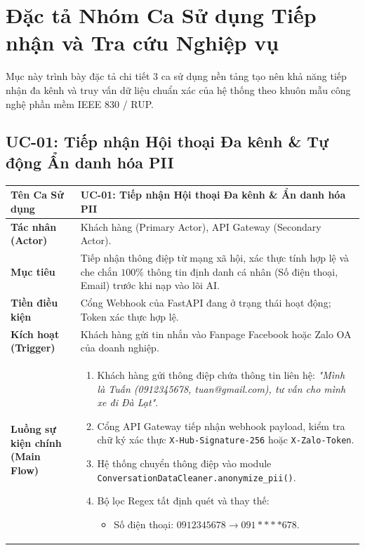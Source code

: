 \section{Đặc tả Nhóm Ca Sử dụng Tiếp nhận và Tra cứu Nghiệp vụ}
\label{sec:dacta_tuvan_nghiepvu}

Mục này trình bày đặc tả chi tiết 3 ca sử dụng nền tảng tạo nên khả năng tiếp nhận đa kênh và truy vấn dữ liệu chuẩn xác của hệ thống theo khuôn mẫu công nghệ phần mềm IEEE 830 / RUP.

\subsection{UC-01: Tiếp nhận Hội thoại Đa kênh \& Tự động Ẩn danh hóa PII}
\label{subsec:spec_uc01}

\begin{table}[h!]
\centering
\small
\begin{tabular}{|p{3.2cm}|p{11.5cm}|}
\hline
\textbf{Tên Ca Sử dụng} & \textbf{UC-01: Tiếp nhận Hội thoại Đa kênh \& Ẩn danh hóa PII} \\
\hline
\textbf{Tác nhân (Actor)} & Khách hàng (Primary Actor), API Gateway (Secondary Actor). \\
\hline
\textbf{Mục tiêu} & Tiếp nhận thông điệp từ mạng xã hội, xác thực tính hợp lệ và che chắn $100\%$ thông tin định danh cá nhân (Số điện thoại, Email) trước khi nạp vào lõi AI. \\
\hline
\textbf{Tiền điều kiện} & Cổng Webhook của FastAPI đang ở trạng thái hoạt động; Token xác thực hợp lệ. \\
\hline
\textbf{Kích hoạt (Trigger)} & Khách hàng gửi tin nhắn vào Fanpage Facebook hoặc Zalo OA của doanh nghiệp. \\
\hline
\textbf{Luồng sự kiện chính (Main Flow)} & 
\begin{enumerate}
    \item Khách hàng gửi thông điệp chứa thông tin liên hệ: \textit{"Mình là Tuấn (0912345678, tuan@gmail.com), tư vấn cho mình xe đi Đà Lạt"}.
    \item Cổng API Gateway tiếp nhận webhook payload, kiểm tra chữ ký xác thực \texttt{X-Hub-Signature-256} hoặc \texttt{X-Zalo-Token}.
    \item Hệ thống chuyển thông điệp vào module \texttt{ConversationDataCleaner.anonymize\_pii()}.
    \item Bộ lọc Regex tất định quét và thay thế:
    \begin{itemize}
        \item Số điện thoại: $0912345678 \longrightarrow 091****678$.

\end{itemize}
\end{enumerate}
\end{tabular}
\end{table}

